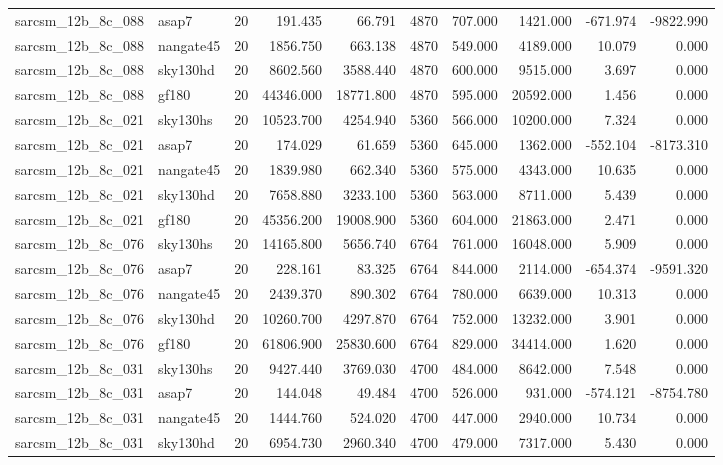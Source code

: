 \begin{tabular}{llrrrrrrrr}
sarcsm\_12b\_8c\_088 & asap7 & 20 & 191.435 & 66.791 & 4870 & 707.000 & 1421.000 & -671.974 & -9822.990 \\
sarcsm\_12b\_8c\_088 & nangate45 & 20 & 1856.750 & 663.138 & 4870 & 549.000 & 4189.000 & 10.079 & 0.000 \\
sarcsm\_12b\_8c\_088 & sky130hd & 20 & 8602.560 & 3588.440 & 4870 & 600.000 & 9515.000 & 3.697 & 0.000 \\
sarcsm\_12b\_8c\_088 & gf180 & 20 & 44346.000 & 18771.800 & 4870 & 595.000 & 20592.000 & 1.456 & 0.000 \\
sarcsm\_12b\_8c\_021 & sky130hs & 20 & 10523.700 & 4254.940 & 5360 & 566.000 & 10200.000 & 7.324 & 0.000 \\
sarcsm\_12b\_8c\_021 & asap7 & 20 & 174.029 & 61.659 & 5360 & 645.000 & 1362.000 & -552.104 & -8173.310 \\
sarcsm\_12b\_8c\_021 & nangate45 & 20 & 1839.980 & 662.340 & 5360 & 575.000 & 4343.000 & 10.635 & 0.000 \\
sarcsm\_12b\_8c\_021 & sky130hd & 20 & 7658.880 & 3233.100 & 5360 & 563.000 & 8711.000 & 5.439 & 0.000 \\
sarcsm\_12b\_8c\_021 & gf180 & 20 & 45356.200 & 19008.900 & 5360 & 604.000 & 21863.000 & 2.471 & 0.000 \\
sarcsm\_12b\_8c\_076 & sky130hs & 20 & 14165.800 & 5656.740 & 6764 & 761.000 & 16048.000 & 5.909 & 0.000 \\
sarcsm\_12b\_8c\_076 & asap7 & 20 & 228.161 & 83.325 & 6764 & 844.000 & 2114.000 & -654.374 & -9591.320 \\
sarcsm\_12b\_8c\_076 & nangate45 & 20 & 2439.370 & 890.302 & 6764 & 780.000 & 6639.000 & 10.313 & 0.000 \\
sarcsm\_12b\_8c\_076 & sky130hd & 20 & 10260.700 & 4297.870 & 6764 & 752.000 & 13232.000 & 3.901 & 0.000 \\
sarcsm\_12b\_8c\_076 & gf180 & 20 & 61806.900 & 25830.600 & 6764 & 829.000 & 34414.000 & 1.620 & 0.000 \\
sarcsm\_12b\_8c\_031 & sky130hs & 20 & 9427.440 & 3769.030 & 4700 & 484.000 & 8642.000 & 7.548 & 0.000 \\
sarcsm\_12b\_8c\_031 & asap7 & 20 & 144.048 & 49.484 & 4700 & 526.000 & 931.000 & -574.121 & -8754.780 \\
sarcsm\_12b\_8c\_031 & nangate45 & 20 & 1444.760 & 524.020 & 4700 & 447.000 & 2940.000 & 10.734 & 0.000 \\
sarcsm\_12b\_8c\_031 & sky130hd & 20 & 6954.730 & 2960.340 & 4700 & 479.000 & 7317.000 & 5.430 & 0.000 \\

\end{tabular}

